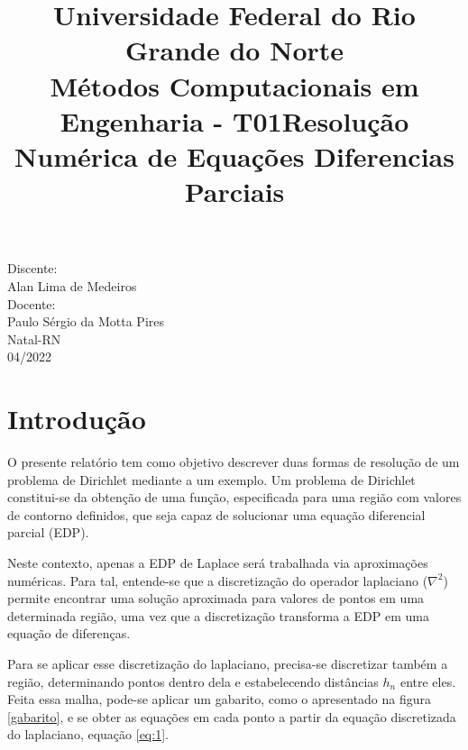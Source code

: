 \documentclass[a4paper,11pt]{article}
\title{Universidade Federal do Rio Grande do Norte\\Métodos Computacionais em Engenharia - T01\linebreak\linebreak\linebreak Resolução Numérica de Equações Diferencias Parciais}
\author{}
\date{}
\begin{document}
\maketitle
\thispagestyle{empty}
\vspace{2cm}
\begin{minipage}{\textwidth}
\flushright
{\large
Discente:\\
Alan Lima de Medeiros\\
\vspace{0.5cm}
\vspace{0.5cm}
Docente:\\
Paulo Sérgio da Motta Pires\\}
\vspace{7cm}
\center
{\large
Natal-RN\\04/2022}
\end{minipage} 

\tableofcontents

\pagebreak

\section{Introdução}
    O presente relatório tem como objetivo descrever duas formas de resolução de um problema de Dirichlet mediante a um exemplo. Um problema de Dirichlet constitui-se da obtenção de uma função, especificada para uma região com valores de contorno definidos, que seja capaz de solucionar uma equação diferencial parcial (EDP). 
    
    Neste contexto, apenas a EDP de Laplace será trabalhada via aproximações numéricas. Para tal, entende-se que a discretização do operador laplaciano ($\nabla^2$) permite encontrar uma solução aproximada para valores de pontos em uma determinada região, uma vez que a discretização transforma a EDP em uma equação de diferenças.
    
    Para se aplicar esse discretização do laplaciano, precisa-se discretizar também a região, determinando pontos dentro dela e estabelecendo distâncias $h_n$ entre eles. Feita essa malha, pode-se aplicar um gabarito, como o apresentado na figura \ref{gabarito}, e se obter as equações em cada ponto a partir da equação discretizada do laplaciano, equação \ref{eq:1}.
    
\end{document}
